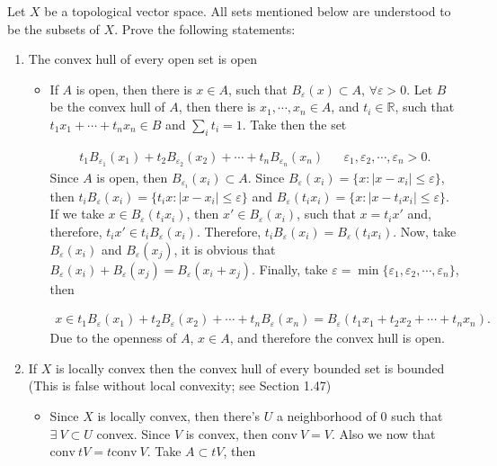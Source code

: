 Let $X$ be a topological vector space. All sets mentioned below are understood to be the subsets of $X$. Prove the following statements:
\begin{enumerate}
    \item The convex hull of every open set is open
    \begin{itemize}
        \item If $A$ is open, then there is $x\in A$, such that $B_{\varepsilon}(x)\subset A$, $\forall \varepsilon >0$. Let $B$ be the convex hull of $A$, then there is $x_1,\cdots,x_n\in A$, and $t_i\in\mathbb{R}$, such that $t_1x_1+\cdots+t_nx_n\in B$ and $\sum_it_i=1$. Take then the set

        \begin{align*}
            t_1B_{\varepsilon_1}(x_1)+t_2B_{\varepsilon_2}(x_2)+\cdots+t_nB_{\varepsilon_n}(x_n) && \varepsilon_1, \varepsilon_2,\cdots,\varepsilon_n >0.
        \end{align*}
        Since $A$ is open, then $B_{\varepsilon_i}(x_i)\subset A$. Since $B_\varepsilon(x_i)=\{x: |x-x_i|\leq\varepsilon\}$, then $t_iB_\varepsilon(x_i)=\{t_ix: |x-x_i|\leq\varepsilon\}$ and $B_\varepsilon(t_ix_i)=\{x: |x-t_ix_i|\leq\varepsilon\}$. If we take $x\in B_\varepsilon(t_ix_i)$, then $x'\in B_\varepsilon(x_i)$, such that $x=t_ix'$ and, therefore, $t_ix'\in t_iB_\varepsilon(x_i)$. Therefore, $t_iB_\varepsilon(x_i)=B_\varepsilon(t_ix_i)$. Now, take $B_\varepsilon(x_i)$ and $B_\varepsilon(x_j)$, it is obvious that $B_\varepsilon(x_i)+B_\varepsilon(x_j)=B_\varepsilon(x_i+x_j)$. Finally, take $\varepsilon=\min\{\varepsilon_1,\varepsilon_2,\cdots,\varepsilon_n\}$, then

        \begin{align*}
            x \in t_1B_{\varepsilon}(x_1)+t_2B_{\varepsilon}(x_2)+\cdots+t_nB_{\varepsilon}(x_n)=B_{\varepsilon}(t_1x_1+t_2x_2+\cdots+t_nx_n).
        \end{align*}
        Due to the openness of $A$, $x\in A$, and therefore the convex hull is open.

    \end{itemize}

    \item If $X$ is locally convex then the convex hull of every bounded set is bounded (This is false without local convexity; see Section 1.47)
    \begin{itemize}
        \item Since $X$ is locally convex, then there's $U$ a neighborhood of $0$ such that $\exists \ V \subset U$ convex. Since $V$ is convex, then $\text{conv}\ V=V$. Also we now that $\text{conv} \ tV=t\text{conv} \ V$. Take $A\subset tV$, then
        

\end{itemize}
\end{enumerate}
